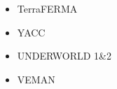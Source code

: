 \begin{itemize}
\item TerraFERMA
\cite{wisv14}
\cite{wisv17}
\cite{spmw16}
\cite{ceww17}
\cite{ceww19}


\item YACC
\cite{tosn15}
\cite{tomy16}

\item UNDERWORLD 1\&2
\cite{stfs06}
\cite{moql07} 
\cite{stfs07}
\cite{lemm08}
\cite{ozrs08}
\cite{casm10}
\cite{mamb10}
\cite{stsf10}
\cite{stfc10}
\cite{fasm10}
\cite{cafz11}
\cite{cafa12}
\cite{bemm13}
\cite{scmo13}
\cite{faca13}
\cite{famc14}
\cite{quxm15}
\cite{bemm15}
\cite{scsp15}
\cite{shmj15}
\cite{shmv16}
\cite{onlw16}
\cite{kicf16}
\cite{memm18}
\cite{samo19}
\cite{yamg19}

\item VEMAN
\cite{bepo10}


\end{itemize}
